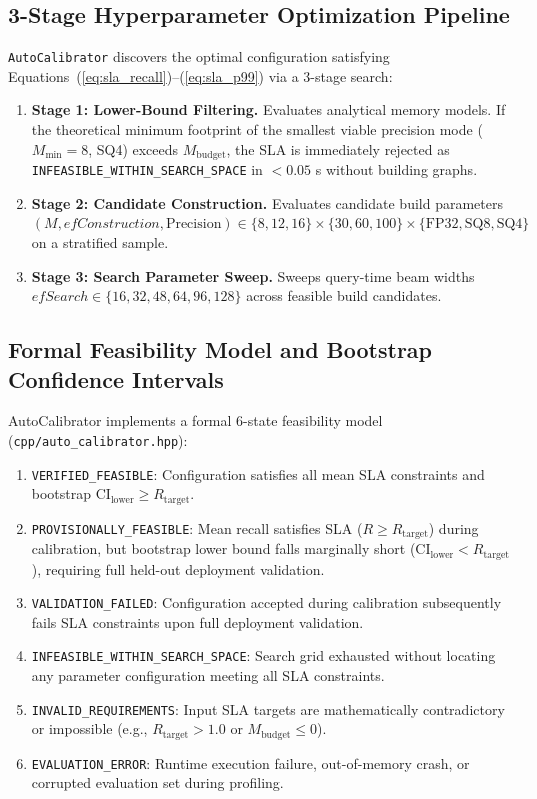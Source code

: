 \documentclass[10pt,journal,compsoc]{IEEEtran}
\begin{document}
\subsection{3-Stage Hyperparameter Optimization Pipeline}
\texttt{AutoCalibrator} discovers the optimal configuration satisfying Equations~(\ref{eq:sla_recall})--(\ref{eq:sla_p99}) via a 3-stage search:
\begin{enumerate}
    \item \textbf{Stage 1: Lower-Bound Filtering.} Evaluates analytical memory models. If the theoretical minimum footprint of the smallest viable precision mode ($M_{\min}=8$, SQ4) exceeds $M_{\text{budget}}$, the SLA is immediately rejected as \texttt{INFEASIBLE\_WITHIN\_SEARCH\_SPACE} in $< 0.05$ s without building graphs.
    \item \textbf{Stage 2: Candidate Construction.} Evaluates candidate build parameters $(M, efConstruction, \text{Precision}) \in \{8, 12, 16\} \times \{30, 60, 100\} \times \{\text{FP32}, \text{SQ8}, \text{SQ4}\}$ on a stratified sample.
    \item \textbf{Stage 3: Search Parameter Sweep.} Sweeps query-time beam widths $efSearch \in \{16, 32, 48, 64, 96, 128\}$ across feasible build candidates.
\end{enumerate}

\subsection{Formal Feasibility Model and Bootstrap Confidence Intervals}
AutoCalibrator implements a formal 6-state feasibility model (\texttt{cpp/auto\_calibrator.hpp}):
\begin{enumerate}
    \item \texttt{VERIFIED\_FEASIBLE}: Configuration satisfies all mean SLA constraints and bootstrap $\text{CI}_{\text{lower}} \ge R_{\text{target}}$.
    \item \texttt{PROVISIONALLY\_FEASIBLE}: Mean recall satisfies SLA ($R \ge R_{\text{target}}$) during calibration, but bootstrap lower bound falls marginally short ($\text{CI}_{\text{lower}} < R_{\text{target}}$), requiring full held-out deployment validation.
    \item \texttt{VALIDATION\_FAILED}: Configuration accepted during calibration subsequently fails SLA constraints upon full deployment validation.
    \item \texttt{INFEASIBLE\_WITHIN\_SEARCH\_SPACE}: Search grid exhausted without locating any parameter configuration meeting all SLA constraints.
    \item \texttt{INVALID\_REQUIREMENTS}: Input SLA targets are mathematically contradictory or impossible (e.g., $R_{\text{target}} > 1.0$ or $M_{\text{budget}} \le 0$).
    \item \texttt{EVALUATION\_ERROR}: Runtime execution failure, out-of-memory crash, or corrupted evaluation set during profiling.
\end{enumerate}
\end{document}
